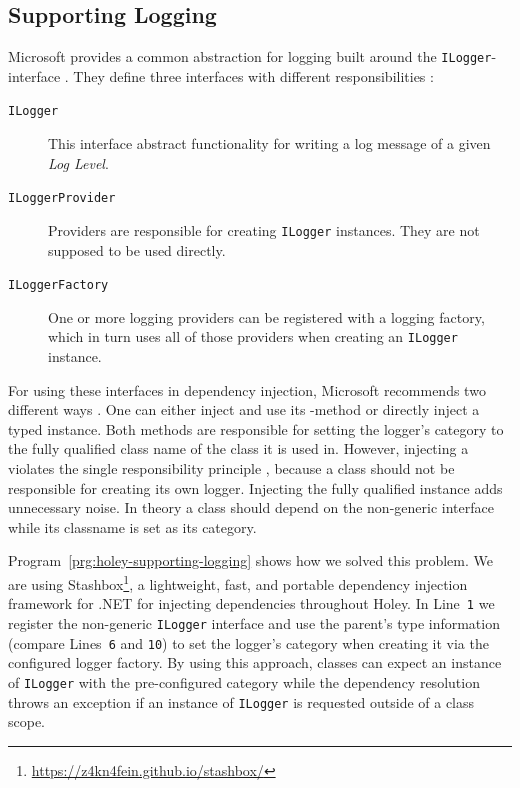 \subsection{Supporting Logging}
\label{sec:holey-supporting-logging}
Microsoft provides a common abstraction for logging built around the \verb|ILogger|-interface \cite{microsoft_logging_2023}.
They define three interfaces with different responsibilities \cite{bahreini_should_2018}:
%
\begin{description}
    \item[\texttt{ILogger}] This interface abstract functionality for writing a log message of a given \emph{Log Level}.
    \item[\texttt{ILoggerProvider}] Providers are responsible for creating \verb|ILogger| instances. They are not supposed to be used directly.
    \item[\texttt{ILoggerFactory}] One or more logging providers can be registered with a logging factory, which in turn uses all of those providers when creating an \verb|ILogger| instance.
\end{description}

For using these interfaces in dependency injection, Microsoft recommends two different ways \cite{microsoft_logging_2023}.
One can either inject \texttt{} and use its \texttt{}-method or directly inject a typed \texttt{} instance.
Both methods are responsible for setting the logger's category to the fully qualified class name of the class it is used in.
However, injecting a \texttt{} violates the single responsibility principle \cite{bahreini_should_2018}, because a class should not be responsible for creating its own logger.
Injecting the fully qualified \texttt{} instance adds unnecessary noise.
In theory a class should depend on the non-generic interface \texttt{} while its classname is set as its category.

Program~\ref{prg:holey-supporting-logging} shows how we solved this problem.
We are using Stashbox\footnote{\url{https://z4kn4fein.github.io/stashbox/}}, a lightweight, fast, and portable dependency injection framework for .NET for injecting dependencies throughout Holey.
In Line~\verb|1| we register the non-generic \verb|ILogger| interface and use the parent's type information (compare Lines~\verb|6| and \verb|10|) to set the logger's category when creating it via the configured logger factory.
By using this approach, classes can expect an instance of \verb|ILogger| with the pre-configured category while the dependency resolution throws an exception if an instance of \verb|ILogger| is requested outside of a class scope.


